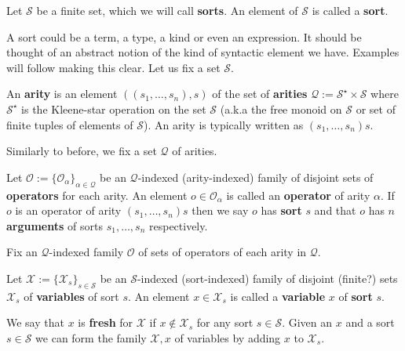 \begin{defin}[Sorts]
    Let $\mathcal{S}$ be a finite set, which we will call \textbf{sorts}. An element of $\mathcal{S}$ is called a \textbf {sort}.
\end{defin}

A sort could be a term, a type, a kind or even an expression. It should be thought of an abstract notion of the kind of syntactic element we have. Examples will follow making this clear. Let us fix a set $\mathcal S$.

\begin{defin}[Arities]
    An \textbf{arity} is an element $((s_1,\dots,s_n),s)$ of the set of \textbf{arities} $\mathcal{Q}:=\mathcal{S}^\star \times \mathcal{S}$ where $\mathcal{S}^\star$ is the Kleene-star operation on the set $\mathcal{S}$ (a.k.a the free monoid on $\mathcal{S}$ or set of finite tuples of elements of $\mathcal{S}$). An arity is typically written as $(s_1,\dots,s_n)s$. 
\end{defin}

Similarly to before, we fix a set $\mathcal{Q}$ of arities.

\begin{defin}[Operators]
    Let $\mathcal{O} :=\{ \mathcal{O}_\alpha \}_{\alpha \in \mathcal{Q}}$ be an $\mathcal{Q}$-indexed (arity-indexed) family of disjoint sets of \textbf{operators} for each arity. An element $o \in \mathcal{O}_\alpha$ is called an \textbf{operator} of arity $\alpha$. If $o$ is an operator of arity $(s_1,\dots,s_n)s$ then we say $o$ has \textbf{sort} $s$ and that $o$ has $n$ \textbf{arguments} of sorts $s_1,\dots,s_n$ respectively.
\end{defin}

Fix an $\mathcal{Q}$-indexed family $\mathcal{O}$ of sets of operators of each arity in $\mathcal{Q}$.

\begin{defin}[Variables]
    Let $\mathcal{X}:= \{ \mathcal{X}_s\}_{s \in \mathcal{S}}$ be an $\mathcal{S}$-indexed (sort-indexed) family of disjoint (finite?) sets $\mathcal{X}_s$ of \textbf{variables} of sort $s$. An element $x\in\mathcal{X}_s$ is called a \textbf{variable} $x$ of \textbf{sort} $s$. 
\end{defin}

\begin{defin}
    We say that $x$ is \textbf{fresh} for $\mathcal{X}$ if $x \not\in \mathcal{X}_s$ for any sort $s\in \mathcal{S}$. Given an $x$ and a sort $s\in \mathcal{S}$ we can form the family $\mathcal{X},x$ of variables by adding $x$ to $\mathcal{X}_s$. 
\end{defin}

